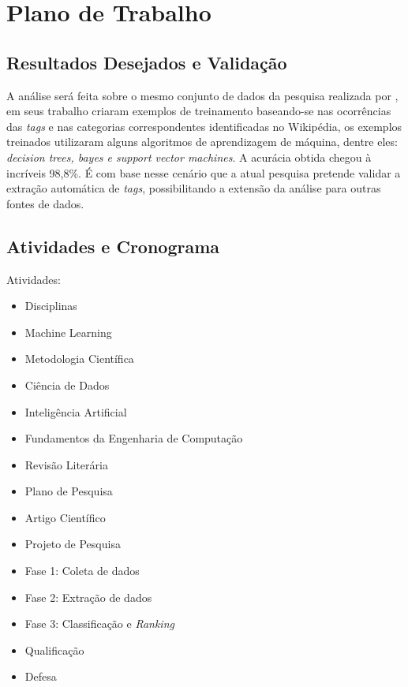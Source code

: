 \documentclass[10pt,a4paper,final]{article}
\begin{document}
  
    \section{Plano de Trabalho}

    \subsection{Resultados Desejados e Validação}
A análise será feita sobre o mesmo conjunto de dados da pesquisa realizada por \cite{Arash2016}, em seus trabalho \cite{Joorabchi2015} criaram exemplos de treinamento baseando-se nas ocorrências das \textit{tags} e nas categorias correspondentes identificadas no Wikipédia, os exemplos treinados utilizaram alguns algoritmos de aprendizagem de máquina, dentre eles: \textit{decision trees, bayes e support vector machines}. A acurácia obtida chegou à incríveis 98,8\%. É com base nesse cenário que a atual pesquisa pretende validar a extração automática de \textit{tags}, possibilitando a extensão da análise para outras fontes de dados.
 
    \subsection{Atividades e Cronograma}
    
Atividades:
    \begin{itemize}
    \item Disciplinas
	\item[] \quad Machine Learning
    \item[] \quad Metodologia Científica
    \item[] \quad Ciência de Dados
    \item[] \quad Inteligência Artificial
    \item[] \quad Fundamentos da Engenharia de Computação
    \item Revisão Literária
    \item Plano de Pesquisa
    \item Artigo Científico
    \item Projeto de Pesquisa
    \item[] \quad Fase 1: Coleta de dados
    \item[] \quad Fase 2: Extração de dados
    \item[] \quad Fase 3: Classificação e \textit{Ranking}
    \item Qualificação
    \item Defesa
    \end{itemize}
\end{document}
